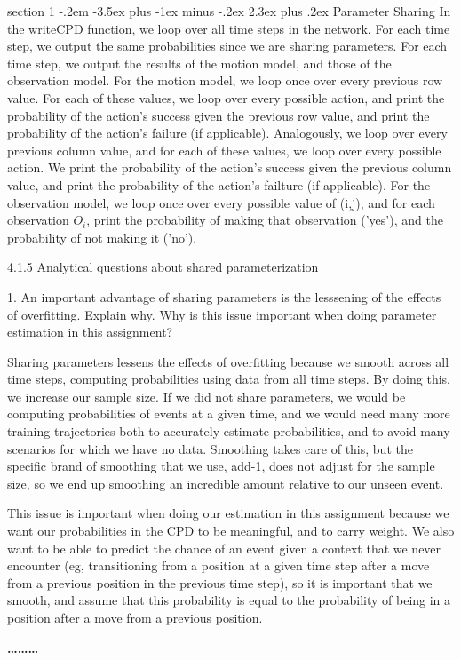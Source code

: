 \documentclass[12pt]{article}
\makeatletter
\newenvironment{problem}{\@startsection
       {section}
       {1}
       {-.2em}
       {-3.5ex plus -1ex minus -.2ex}
       {2.3ex plus .2ex}
       {\pagebreak[3]%
       \large\bf\noindent{Problem }
       }
       }
       {%
       \begin{center}\large\bf \ldots\ldots\ldots\end{center}}
\makeatother
\begin{document}
\begin{problem}{Parameter Sharing}
In the writeCPD function, we loop over all time steps in the network.
For each time step, we output the same probabilities since we are 
sharing parameters.  For each time step, we output the results of the 
motion model, and those of the observation model.
For the motion model, we loop once over every previous row value.  For 
each of these values, we loop over every possible action, and print the
probability of the action's success given the previous row value, and
print the probability of the action's failure (if applicable).  
Analogously, we loop over every previous column value, and for each of 
these values, we loop over every possible action.  We print the 
probability of the action's success given the previous column value, and
print the probability of the action's failture (if applicable).
For the observation model, we loop once over every possible value of 
(i,j), and for each observation $O_i$, print the probability of making 
that observation ('yes'), and the probability of not making it ('no').

4.1.5  Analytical questions about shared parameterization

1. An important advantage of sharing parameters is the lesssening of the
effects of overfitting.  Explain why.  Why is this issue important when
doing parameter estimation in this assignment?

Sharing parameters lessens the effects of overfitting because we smooth
across all time steps, computing probabilities using data from all time
 steps.  By doing this, we increase our sample size.  If we did not 
share parameters, we would be computing probabilities of events at a 
given time, and we would need many more training trajectories both to 
accurately estimate probabilities, and to avoid many scenarios for which
we have no data.  Smoothing takes care of this, but the specific brand 
of smoothing that we use, add-1, does not adjust for the sample size, so
we end up smoothing an incredible amount relative to our unseen event.

This issue is important when doing our estimation in this assignment 
because we want our probabilities in the CPD to be meaningful, and to 
carry weight.  We also want to be able to predict the chance of an event
given a context that we never encounter (eg, transitioning from a 
position at a given time step after a move from a previous position in 
the previous time step), so it is important that we smooth, and assume 
that this probability is equal to the probability of being in a 
position after a move from a previous position.


\end{problem}
\end{document}
